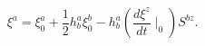 \begin{equation}
\xi ^{a}=\xi _{0}^{a}+\frac{1}{2}h_{b}^{a}\xi _{0}^{b}-h_{b}^{a}(\frac{d\xi
^{z}}{dt}\mid _{0})S^{bz}.  \label{55}
\end{equation}

